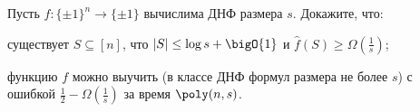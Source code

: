 Пусть $f\colon \{\pm 1\}^n \to \{\pm 1\}$ вычислима ДНФ размера $s$. Докажите, что:
\begin{enumcyr}
    \item существует $S \subseteq [n]$, что $|S| \le \log s + \bigO{1}$ и $\hat{f}(S) \ge
        \Omega(\frac{1}{s})$;
    \item функцию $f$ можно выучить (в классе ДНФ формул размера не более $s$) с ошибкой $\frac{1}{2} -
        \Omega(\frac{1}{s})$ за время $\poly(n, s)$.
\end{enumcyr}